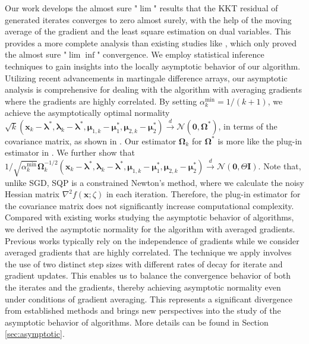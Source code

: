 \documentclass[aos]{imsart}
\numberwithin{equation}{section}
\theoremstyle{plain}
\begin{document}
Our work develops the almost sure "$\lim$" results that the KKT residual of generated iterates converges to zero almost surely, with the help of the moving average of the gradient and the least square estimation on dual variables. This provides a more complete analysis than existing studies like \cite{curtis2023sequential}, which only proved the almost sure "$\lim \inf$" convergence.
We employ statistical inference techniques to gain insights into the locally asymptotic behavior of our algorithm. Utilizing recent advancements in martingale difference arrays, our asymptotic analysis is comprehensive for dealing with the algorithm with averaging gradients where the gradients are highly correlated. 
By setting $\alpha_k^{\text{min}} = 1 / (k+1)$, we achieve the asymptotically optimal normality $\sqrt{k}  (\bm{x}_k - \bm{\lambda}^{*}, \bm{\lambda}_{k} - \bm{\lambda}^{*}, \bm{\mu}_{1,k} - \bm{\mu}_1^{*}, \bm{\mu}_{2,k} - \bm{\mu}_2^{*}) \stackrel{d}{\longrightarrow} \mathcal{N} \left( \bm{0}, \bm{\Omega}^{*} \right)$, in terms of the covariance matrix, as shown in \cite{duchi2021asymptotic}. Our estimator  $\bm{\Omega}_k$ for $\bm{\Omega}^{*}$ is more like the plug-in estimator in \cite{chen2020statistical}. We further show that $1/\sqrt{\alpha_k^{\text{min}}} \bm{\Omega}_k^{-1/2}(\bm{x}_k - \bm{\lambda}^{*}, \bm{\lambda}_{k} - \bm{\lambda}^{*}, \bm{\mu}_{1,k} - \bm{\mu}_1^{*}, \bm{\mu}_{2,k} - \bm{\mu}_2^{*}) \stackrel{d}{\longrightarrow} \mathcal{N} \left( \bm{0}, \Theta \bm{I} \right)$. Note that, unlike SGD, SQP is a constrained Newton's method, where we calculate the noisy Hessian matrix $\nabla^2 f(\bm{x};\zeta)$ in each iteration. Therefore, the plug-in estimator for the covariance matrix does not significantly increase computational complexity. Compared with existing works studying the asymptotic behavior of algorithms, we derived the asymptotic normality for the algorithm with averaged gradients. Previous works typically rely on the independence of gradients while we consider averaged gradients that are highly correlated.
The technique we apply involves the use of two distinct step sizes with different rates of decay for iterate and gradient updates. This enables us to balance the convergence behavior of both the iterates and the gradients, thereby achieving asymptotic normality even under conditions of gradient averaging.
This represents a significant divergence from established methods and brings new perspectives into the study of the asymptotic behavior of algorithms. More details can be found in Section \ref{sec:asymptotic}.
\end{document}
